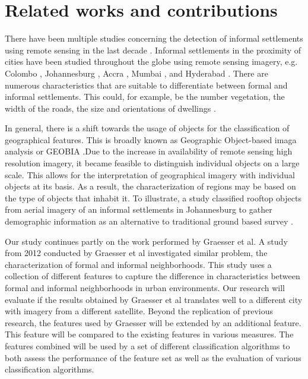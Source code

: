 \section{Related works and contributions}

There have been multiple studies concerning the detection of informal
settlements using remote sensing in the last decade \cite{kuffer2016slums}.
Informal settlements in the proximity of cities have been studied throughout
the globe using remote sensing imagery, e.g. Colombo \cite{colombo},
Johannesburg \cite{williams2016automatic}, Accra \cite{accra}, Mumbai
\cite{mumbai}, and Hyderabad \cite{hyderabad}. There are numerous
characteristics that are suitable to differentiate between formal and informal
settlements. This could, for example,  be the number vegetation, the width of
the roads, the size and orientations of dwellings \cite{owen2013approach}.

In general, there is a shift towards the usage of objects for the
classification of geographical features. This is broadly known as Geographic
Object-based imaga analysis or GEOBIA \cite{hay2008geographic}.Due to the
increase in availability of remote sensing high resolution imagery, it became
feasible to distinguish individual objects on a large scale.  This allows for
the interpretation of geographical imagery with individual objects at its
basis.  As a result, the characterization of regions may be based on the type
of objects that inhabit it.  To illustrate, a study classified rooftop objects
from aerial imagery of an informal settlements in Johannesburg to gather
demographic information as an alternative to traditional ground based survey
\cite{williams2016automatic}.


Our study continues partly on the work performed by Graesser et al.  A study
from 2012 conducted by Graesser et al  investigated similar
problem, the characterization of formal and informal neighborhoods.  This study
uses a collection of different features to capture the difference in
characteristics between formal and informal neighborhoods in urban
environments. Our research will evaluate if the results obtained by Graesser et
al translates well to a different city with imagery from a different
satellite. Beyond the replication of previous research, the features used by
Graesser will be extended by an additional feature. This feature will be
compared to the existing features in various measures. The features combined
will be used by a set of different classification algorithms to both assess the
performance of the feature set as well as the evaluation of various
classification algorithms.


